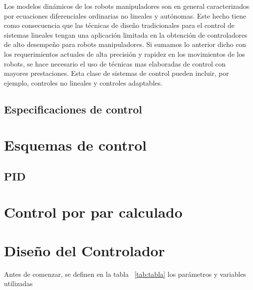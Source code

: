 Los modelos dinámicos de los robots manipuladores son en general caracterizados por ecuaciones diferenciales ordinarias no lineales y autónomas. Este hecho tiene como consecuencia que las técnicas de diseño tradicionales para el control de sistemas lineales tengan una aplicación limitada en la obtención de controladores de alto desempeño para robots manipuladores. Si sumamos lo anterior dicho con los requerimientos actuales de alta precisión y rapidez en los movimientos de los robots, se hace necesario el uso de técnicas mas elaboradas de control con mayores prestaciones. Esta clase de sistemas de control pueden incluir, por ejemplo, controles no lineales y controles adaptables.\\
\subsection{Especificaciones de control}



\section{Esquemas de control}

\subsection{PID}

\section{Control por par calculado}

\section{Diseño del Controlador}
Antes de comenzar, se definen  en la tabla ~\ref{tab:tabla} los parámetros y variables utilizadas

